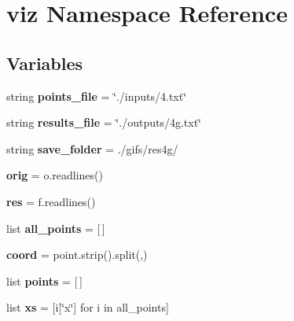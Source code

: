 \hypertarget{namespaceviz}{}\section{viz Namespace Reference}
\label{namespaceviz}
\subsection*{Variables}
\begin{DoxyCompactItemize}
\item 
\mbox{\label{namespaceviz_ad81e048a14308ac78529a2ffab5f840d}} 
string {\bfseries points\+\_\+file} = \char`\"{}./inputs/4.txt\char`\"{}
\item 
\mbox{\label{namespaceviz_a67692ad97c31ca8a38e7782c14c35a8a}} 
string {\bfseries results\+\_\+file} = \char`\"{}./outputs/4g.\+txt\char`\"{}
\item 
\mbox{\label{namespaceviz_ae860dcbc3ac52db67b40fb426d00e796}} 
string {\bfseries save\+\_\+folder} = \textquotesingle{}./gifs/res4g/\textquotesingle{}
\item 
\mbox{\label{namespaceviz_a4d8ae4a594628aab357f474814f27936}} 
{\bfseries orig} = o.\+readlines()
\item 
\mbox{\label{namespaceviz_a6037ad5d1818b795e635575506b7ee25}} 
{\bfseries res} = f.\+readlines()
\item 
\mbox{\label{namespaceviz_ad7494f86d24e37c9e9cbfc22550e0da6}} 
list {\bfseries all\+\_\+points} = \mbox{[}$\,$\mbox{]}
\item 
\mbox{\label{namespaceviz_ac05ef98c53769f73a58977ecd93db4ea}} 
{\bfseries coord} = point.\+strip().split(\textquotesingle{},\textquotesingle{})
\item 
\mbox{\label{namespaceviz_a83a4da68298e655e67caa46fb8e4b9e0}} 
list {\bfseries points} = \mbox{[}$\,$\mbox{]}
\item 
\mbox{\label{namespaceviz_a703405b9ba5a09329dc0936c2bc4932c}} 
list {\bfseries xs} = \mbox{[}i\mbox{[}\char`\"{}x\char`\"{}\mbox{]} for i in all\+\_\+points\mbox{]}

\end{DoxyCompactItemize}
